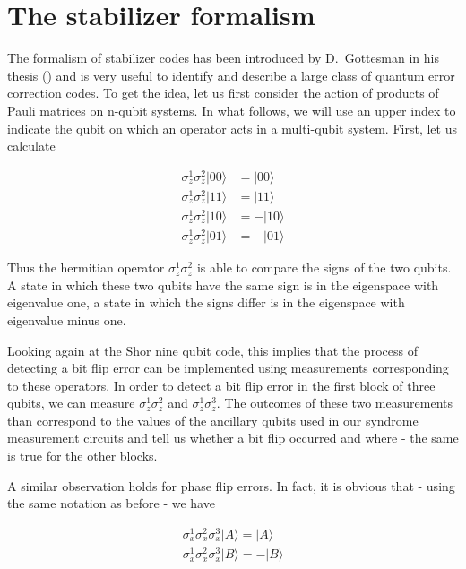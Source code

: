 \documentclass[a4paper, draft]{article}
\theoremstyle{own}
\theoremstyle{remark}
\begin{document}
\section{The stabilizer formalism}

The formalism of stabilizer codes has been introduced by D.~Gottesman in his thesis (\cite{GThesis}) and is very useful to identify and describe a large class of quantum error correction codes. To get the idea, let us first consider the action of products of Pauli matrices on n-qubit systems. In what follows, we will use an upper index to indicate the qubit on which an operator acts in a multi-qubit system. First, let us calculate

\begin{align*}
\sigma_z^1 \sigma_z^2 |00 \rangle &= |00 \rangle \\
\sigma_z^1 \sigma_z^2 |11 \rangle &= |11 \rangle \\
\sigma_z^1 \sigma_z^2 |10 \rangle &= - |10 \rangle \\
\sigma_z^1 \sigma_z^2 |01 \rangle &= -|01 \rangle 
\end{align*}

Thus the hermitian operator $\sigma_z^1 \sigma_z^2$ is able to compare the signs of the two qubits. A state in which these two qubits have the same sign is in the eigenspace with eigenvalue one, a state in which the signs differ is in the eigenspace with eigenvalue minus one. 

Looking again at the Shor nine qubit code, this implies that the process of detecting a bit flip error can be implemented using measurements corresponding to these operators. In order to detect a bit flip error in the first block of three qubits, we can measure $\sigma_z^1 \sigma_z^2$ and $\sigma_z^1 \sigma_z^3$. The outcomes of these two measurements than correspond to the values of the ancillary qubits used in our syndrome measurement circuits and tell us whether a bit flip occurred and where - the same is true for the other blocks. 

A similar observation holds for phase flip errors. In fact, it is obvious that - using the same notation as before - we have

\begin{align*}
\sigma_x^1 \sigma_x^2 \sigma_x^3 |A \rangle = |A \rangle \\
\sigma_x^1 \sigma_x^2 \sigma_x^3 |B \rangle = -|B \rangle 
\end{align*}
\end{document}
